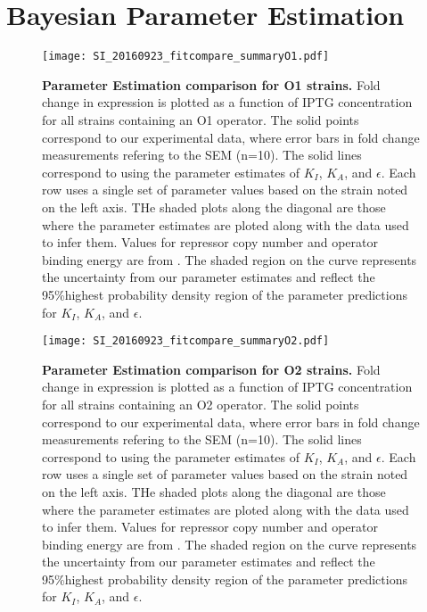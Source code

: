 \section{Bayesian Parameter Estimation} \label{AppendixParamEstimation}

\begin{figure}[h]
	\centering \texttt{[image: SI\_20160923\_fitcompare\_summaryO1.pdf]} 
	\caption{{\bf Parameter Estimation comparison for O1 strains.} Fold change in expression is plotted as a function of IPTG concentration for all strains containing an O1 operator. The solid points correspond to our experimental data, where error bars in fold change measurements refering to the SEM (n=10). The solid lines correspond to \eref[eq7] using the parameter estimates of $K_I$, $K_A$, and $\epsilon$. Each row uses a single set of parameter values based on the strain noted on the left axis. THe shaded plots along the diagonal are those where the parameter estimates are ploted along with the data used to infer them. Values for repressor copy number and operator binding energy are from \cite{Garcia2011}.  The shaded region on the curve represents the uncertainty from our parameter estimates and reflect the 95\%highest probability density region of the parameter predictions for $K_I$, $K_A$, and $\epsilon$.}
	\label{SIfig7}
\end{figure}

\begin{figure}[h]
	\centering \texttt{[image: SI\_20160923\_fitcompare\_summaryO2.pdf]} 
	\caption{{\bf Parameter Estimation comparison for O2 strains.} Fold change in expression is plotted as a function of IPTG concentration for all strains containing an O2 operator. The solid points correspond to our experimental data, where error bars in fold change measurements refering to the SEM (n=10). The solid lines correspond to \eref[eq7] using the parameter estimates of $K_I$, $K_A$, and $\epsilon$. Each row uses a single set of parameter values based on the strain noted on the left axis. THe shaded plots along the diagonal are those where the parameter estimates are ploted along with the data used to infer them. Values for repressor copy number and operator binding energy are from \cite{Garcia2011}.  The shaded region on the curve represents the uncertainty from our parameter estimates and reflect the 95\%highest probability density region of the parameter predictions for $K_I$, $K_A$, and $\epsilon$.}
	\label{SIfig8}
\end{figure}

